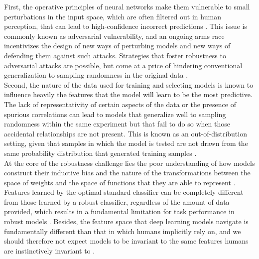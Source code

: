 First, the operative principles of neural networks make them vulnerable
to small perturbations in the input space, which are
often filtered out in human perception, that can lead to high-confidence
incorrect predictions \cite{szegedyIntriguingPropertiesNeural2014}.
This issue is commonly known as adversarial
vulnerability, and an ongoing arms race incentivizes the design 
of new ways of perturbing models and new ways of defending them
against such attacks. Strategies 
that foster robustness to adversarial attacks are possible, but
come at a price of hindering conventional generalization to 
sampling randomness in the original data \cite{tsiprasRobustnessMayBe2019}. \\

Second, the nature of the data used for training and selecting
models is known to influence heavily the features that the model 
will learn to be the most predictive. The lack of representativity of 
certain aspects of the data or the presence of spurious 
correlations can lead to models that generalize well to sampling 
randomness within the same experiment but that fail to do so when those 
accidental relationships are not present. This is known as an
out-of-distribution setting, given that samples in which the model is tested
are not drawn from the same probability distribution that generated
training samples \cite{quinonero-candelaDatasetShiftMachine2009}. \\

At the core of the robustness challenge lies the poor
understanding of how models construct their inductive bias and the nature
of the transformations between the space of weights and the space of 
functions that they are able to represent \cite{jimenezInductiveBiasDeep}. 
Features learned by the optimal standard classifier can be completely 
different from those learned by a robust classifier, regardless 
of the amount of data provided, which results in a fundamental limitation for task 
performance in robust models \cite{tsiprasRobustnessMayBe2019,zhangTheoreticallyPrincipledTradeoff2019}.
Besides, the feature space that deep learning models navigate is fundamentally 
different than that in which humans implicitly rely on, and we 
should therefore not expect models to be invariant to the 
same features humans are instinctively invariant to \cite{ilyasAdversarialExamplesAre2019}. \\

